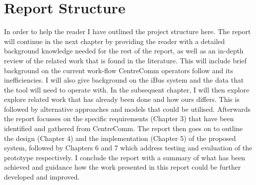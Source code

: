 \section{Report Structure}
In order to help the reader I have outlined the project structure here. The report will continue in the next chapter by providing the reader with a detailed background knowledge needed for the rest of the report, as well as an in-depth review of the related work that is found in the literature. This will include brief background on the current work-flow CentreComm operators follow and its inefficiencies. I will also give background on the iBus system and the data that the tool will need to operate with. In the subsequent chapter, I will then explore explore related work that has already been done and how ours differs. This is followed by alternative approaches and models that could be utilised. Afterwards the report focusses on the specific requirements (Chapter 3) that have been identified and gathered from CentreComm. The report then goes on to outline the design (Chapter 4) and the implementation (Chapter 5) of the proposed system,  followed by Chapters 6 and 7 which address testing and evaluation of the prototype respectively. I conclude the report with a summary of what has been achieved and guidance how the work presented in this report could be further developed and improved.